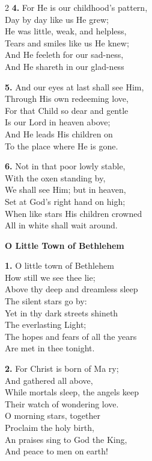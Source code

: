 \documentclass[a5paper,12pt]{article}
\begin{document}
\begin{multicols}{2}
\small
\textbf{4.} For He is our childhood's pattern,\\
Day by day like us He grew;\\
He was little, weak, and helpless,\\
Tears and smiles like us He knew;\\
And He feeleth for our sad-ness,\\
And He shareth in our glad-ness

\textbf{5.} And our eyes at last shall see Him,\\
Through His own redeeming love,\\
For that Child so dear and gentle\\
Is our Lord in heaven above;\\
And He leads His children on\\
To the place where He is gone.

\textbf{6.} Not in that poor lowly stable,\\
With the oxen standing by,\\
We shall see Him; but in heaven,\\
Set at God's right hand on high;\\
When like stars His children crowned\\
All in white shall wait around.

\end{multicols}
\newpage

\begin{center}{\Large\bfseries O Little Town of Bethlehem}\end{center}
\vspace{0.3em}
\textbf{1.} O little town of Bethlehem\\
How still we see thee lie;\\
Above thy deep and dreamless sleep\\
The silent stars go by:\\
Yet in thy dark streets shineth\\
The everlasting Light;\\
The hopes and fears of all the years\\
Are met in thee tonight.

\textbf{2.} For Christ is born of Ma ry;\\
And gathered all above,\\
While mortals sleep, the angels keep\\
Their watch of wondering love.\\
O morning stars, together\\
Proclaim the holy birth,\\
An praises sing to God the King,\\
And peace to men on earth!
\end{document}
